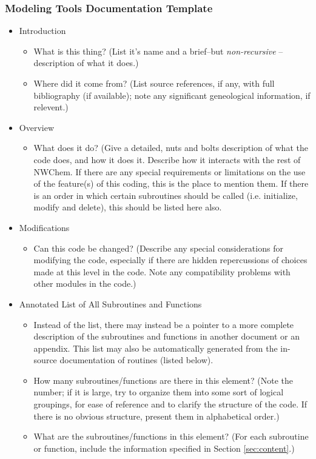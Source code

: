 \subsubsection{Modeling Tools Documentation Template}

\begin{itemize}

\item Introduction

\begin{itemize}
\item What is this thing? (List it's name and a brief--but {\em non-recursive} --
description of what it does.)
\item Where did it come from?  (List source references, if any, with full
bibliography (if available); note any significant geneological information, if relevent.)
\end{itemize}

\item Overview

\begin{itemize}
\item What does it do? (Give a detailed, nuts and bolts description of what
the code does, and how it does it.  Describe how it interacts with the rest of
NWChem.  If there are any special requirements or limitations on the use of the
feature(s) of this coding, this is the place to
mention them.  If there is an order in which certain subroutines should be
called (i.e. initialize, modify and delete), this should be listed here also.
\end{itemize}

\item Modifications

\begin{itemize}
\item Can this code be changed?  (Describe any special considerations for
modifying the code, especially if there are hidden repercussions of choices made
at this level in the code.  Note any compatibility problems with other modules
in the code.)
\end{itemize}

\item Annotated List of All Subroutines and Functions

\begin{itemize}
\item Instead of the list, there may instead be a pointer to a more complete
description of the subroutines and functions in another document or an appendix.
This list may also be automatically generated from the in-source documentation 
of routines (listed below).
\item How many subroutines/functions are there in this element?  (Note the number; if
it is large, try to organize them into some sort of logical groupings, for ease of
reference and to clarify the structure of the code.  If there is no obvious structure,
present them in alphabetical order.)
\item What are the subroutines/functions in this element?  (For each subroutine
or function, include the information specified in Section \ref{sec:content}.)


\end{itemize}
\end{itemize}
